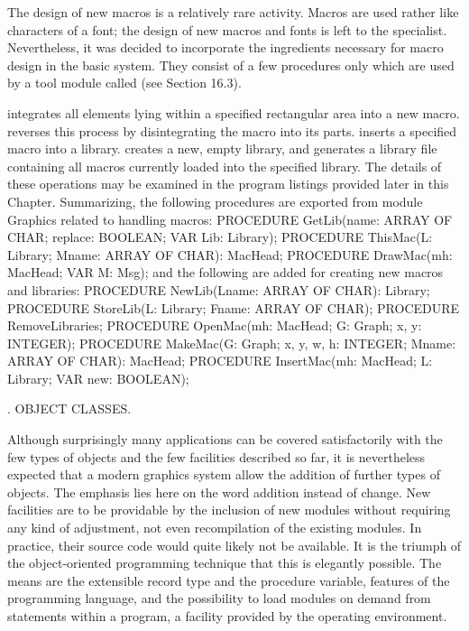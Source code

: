 The design of new macros is a relatively rare activity. Macros are used rather like characters of a font; the design of new macros and fonts is left to the specialist. Nevertheless, it was decided to incorporate the ingredients necessary for macro design in the basic system. They consist of a few procedures only which are used by a tool module called  (see Section 16.3).

 integrates all elements lying within a specified rectangular area into a new macro.  reverses this process by disintegrating the macro into its parts.  inserts a specified macro into a library.  creates a new, empty library, and  generates a library file containing all macros currently loaded into the specified library. The details of these operations may be examined in the program listings provided later in this Chapter. Summarizing, the following procedures are exported from module Graphics related to handling macros:
\begintt
PROCEDURE GetLib(name: ARRAY OF CHAR; replace: BOOLEAN; VAR Lib: Library); PROCEDURE ThisMac(L: Library; Mname: ARRAY OF CHAR): MacHead; PROCEDURE DrawMac(mh: MacHead; VAR M: Msg);
\endtt
and the following are added for creating new macros and libraries:
\begintt
PROCEDURE NewLib(Lname: ARRAY OF CHAR): Library;
PROCEDURE StoreLib(L: Library; Fname: ARRAY OF CHAR);
PROCEDURE RemoveLibraries;
PROCEDURE OpenMac(mh: MacHead; G: Graph; x, y: INTEGER);
PROCEDURE MakeMac(G: Graph; x, y, w, h: INTEGER; Mname: ARRAY OF CHAR): MacHead; PROCEDURE InsertMac(mh: MacHead; L: Library; VAR new: BOOLEAN);
\endtt

. OBJECT CLASSES.

Although surprisingly many applications can be covered satisfactorily with the few types of objects and the few facilities described so far, it is nevertheless expected that a modern graphics system allow the addition of further types of objects. The emphasis lies here on the word addition instead of change. New facilities are to be providable by the inclusion of new modules without requiring any kind of adjustment, not even recompilation of the existing modules. In practice, their source code would quite likely not be available. It is the triumph of the object-oriented programming technique that this is elegantly possible. The means are the extensible record type and the procedure variable, features of the programming language, and the possibility to load modules on demand from statements within a program, a facility provided by the operating environment.

